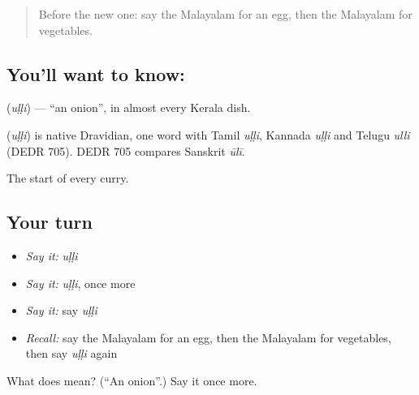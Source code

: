 \label{lesson:ML-C131-onion}



\begin{quote}
Before the new one: say the Malayalam for an egg, then the Malayalam for vegetables.
\end{quote}

\subsection*{You'll want to know: }
\textbf{} (\emph{uḷḷi}) — \textquotedblleft{}an onion\textquotedblright{}, in almost every Kerala dish.

\begin{cousinweb}
\textbf{} (\emph{uḷḷi}) is native Dravidian, one word with Tamil \emph{uḷḷi}, Kannada \emph{uḷḷi} and Telugu \emph{ulli} (DEDR 705). DEDR 705 compares Sanskrit \emph{ūlī}.
\end{cousinweb}

\begin{grammarlens}[title={What you've built}]
The start of every curry.
\end{grammarlens}

\subsection*{Your turn}
\begin{itemize}
\raggedright
  \item \emph{Say it:} \emph{uḷḷi}
  \item \emph{Say it:} \emph{uḷḷi}, once more
  \item \emph{Say it:} say \emph{uḷḷi}
  \item \emph{Recall:} say the Malayalam for an egg, then the Malayalam for vegetables, then say \emph{uḷḷi} again
\end{itemize}

\begin{tcolorbox}[breakable,colback=teal!4,colframe=teal!35!black,title={Before you move on}]
What does  mean? (\textquotedblleft{}An onion\textquotedblright{}.) Say it once more.
\end{tcolorbox}
